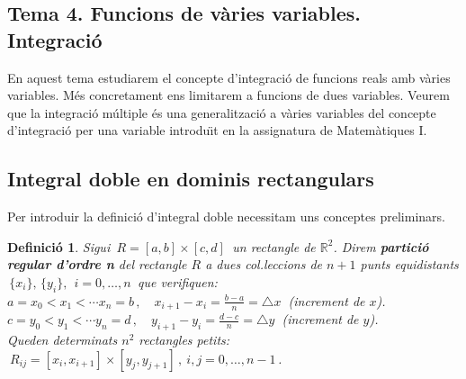 \documentclass[12pt]{article}
\newtheorem{definicio}{Definici{\'o}}[subsection]
\newcommand{\R}{\mathbb{R}}
\begin{document}
\pagestyle{fancy}
\fancyhead{}

\begin{center}
\section{Tema 4. Funcions de vàries variables. Integració}
\end{center}

\parskip =0.3cm
\parindent =0cm
\itemindent=2cm

En aquest tema estudiarem el concepte d'integraci{\'o} de funcions reals
amb v{\`a}ries variables. M{\'e}s concretament ens limitarem
a funcions de dues variables.
Veurem que la integraci{\'o} m{\'u}ltiple {\'e}s una generalitzaci{\'o} a
v{\`a}ries variables del concepte d'integraci{\'o} per una variable
introdu{\"\i}t en la assignatura de Matem{\`a}tiques I.

\vspace*{1cm}
\subsection{Integral doble en dominis rectangulars}

Per introduir la definici{\'o} d'integral doble necessitam uns conceptes
preliminars.

\begin{definicio}
Sigui $\, R=[a,b]\times[c,d]\,$ un rectangle de $\R^2$. Direm
\textbf{partici{\'o} regular d'ordre n} del rectangle $R$ a dues
col.leccions de $n+1$ punts equidistants $\,\{x_i\}, \, \{y_i\}, \ \
i=0,\ldots
,n\,$ que verifiquen:\\

\hspace{3cm}$a=x_0<x_1<\cdots x_n=b\,,\quad
x_{i+1}-x_i=\frac{b-a}{n}=\triangle x\ $ (increment de $x$).\\

\hspace{3cm}$c=y_0<y_1<\cdots y_n=d\,,\quad
y_{i+1}-y_i=\frac{d-c}{n}=\triangle y\ $ (increment de $y$).\\

Queden determinats $n^2$ rectangles petits: $\
R_{ij}=[x_i,x_{i+1}]\times[y_j,y_{j+1}]\,,\ i,j=0,\ldots,n-1\,$.
\end{definicio}
\end{document}
